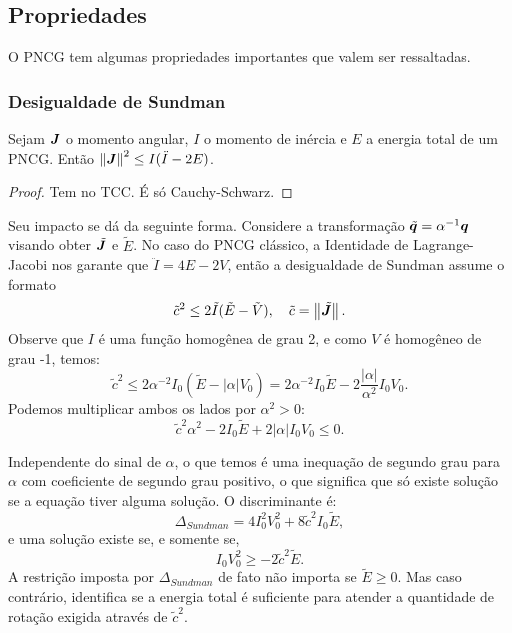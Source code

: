 \subsection{Propriedades}

O PNCG tem algumas propriedades importantes que valem ser ressaltadas.

\subsubsection{Desigualdade de Sundman}

\begin{theorem}
    Sejam $\bm J$ o momento angular, $I$ o momento de inércia e $E$ a energia total de um PNCG. Então $\left\Vert \bm J \right\Vert^2 \leq I(\ddot I - 2E)$.
\end{theorem}
\begin{proof}
    Tem no TCC. É só Cauchy-Schwarz.
\end{proof}

Seu impacto se dá da seguinte forma. Considere a transformação $\tilde{\bm q} = \alpha^{-1} \bm q$ visando obter $\tilde{\bm J}$ e $\tilde E$. No caso do PNCG clássico, a Identidade de Lagrange-Jacobi nos garante que $\ddot I = 4E - 2V$, então a desigualdade de Sundman assume o formato
\begin{equation}
    \tilde c^2 \leq 2 \tilde{I} (\tilde{E} - \tilde V),
    \quad
    \tilde c = \left\Vert \tilde{\bm J} \right\Vert.
\end{equation}
Observe que $I$ é uma função homogênea de grau 2, e como $V$ é homogêneo de grau -1, temos:
\begin{equation}
    \tilde c^2 \leq 2 \alpha^{-2} I_0 (\tilde E - |\alpha| V_0) = 2 \alpha^{-2} I_0 \tilde E - 2 \dfrac{|\alpha|}{\alpha^2} I_0 V_0.
\end{equation}
Podemos multiplicar ambos os lados por $\alpha^2 > 0$:
\begin{equation}\label{eq:inequacao_sundman}
    \tilde c^2 \alpha^2 - 2 I_0 \tilde E + 2 |\alpha| I_0 V_0 \leq 0.
\end{equation}

Independente do sinal de $\alpha$, o que temos é uma inequação de segundo grau para $\alpha$ com coeficiente de segundo grau positivo, o que significa que só existe solução se a equação tiver alguma solução. O discriminante é:
\begin{equation}\label{eq:delta_sundman}
    \Delta_{Sundman} = 4 I_0^2 V_0^2 + 8 \tilde c^2 I_0 \tilde E,
\end{equation}
e uma solução existe se, e somente se,
\begin{equation}
    I_0 V_0^2 \geq -2 \tilde c^2 \tilde E.
\end{equation}
A restrição imposta por $\Delta_{Sundman}$ de fato não importa se $\tilde E \geq 0$. Mas caso contrário, identifica se a energia total é suficiente para atender a quantidade de rotação exigida através de $\tilde c^2$.

